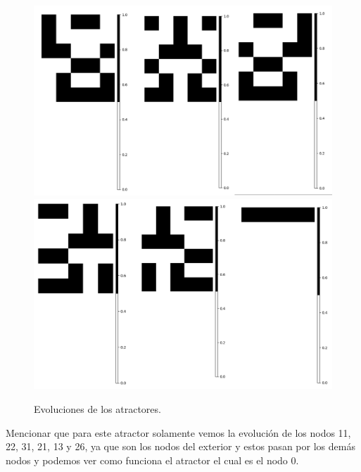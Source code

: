 \documentclass[11pt]{article}
\begin{document}
			\begin{figure}[H]
			\centering
			\includegraphics[scale=0.3]{resources/Atractores22/atractor_22_size_5_res.png}
			\includegraphics[scale=0.3]{resources/Atractores22/atractor_22_size_5_res1.png}
			\caption{Evoluciones de los atractores.}\label{fig:picture}
			\end{figure}
			Mencionar que para este atractor solamente vemos la evolución de los nodos 11, 22, 31, 21, 13 y 26, ya que son los nodos del exterior y estos pasan por los demás nodos y podemos ver como funciona el atractor el cual es el nodo 0.
\end{document}
